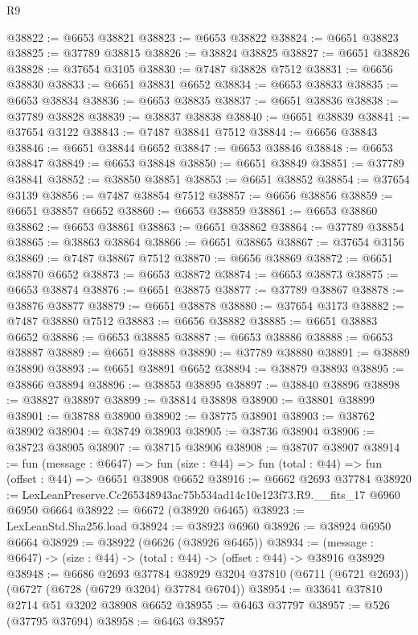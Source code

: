 \begin{lexlean}{R9}
\begin{coremodule}
@38822 := @6653 @38821
@38823 := @6653 @38822
@38824 := @6651 @38823
@38825 := @37789 @38815
@38826 := @38824 @38825
@38827 := @6651 @38826
@38828 := @37654 @3105
@38830 := @7487 @38828 @7512
@38831 := @6656 @38830
@38833 := @6651 @38831 @6652
@38834 := @6653 @38833
@38835 := @6653 @38834
@38836 := @6653 @38835
@38837 := @6651 @38836
@38838 := @37789 @38828
@38839 := @38837 @38838
@38840 := @6651 @38839
@38841 := @37654 @3122
@38843 := @7487 @38841 @7512
@38844 := @6656 @38843
@38846 := @6651 @38844 @6652
@38847 := @6653 @38846
@38848 := @6653 @38847
@38849 := @6653 @38848
@38850 := @6651 @38849
@38851 := @37789 @38841
@38852 := @38850 @38851
@38853 := @6651 @38852
@38854 := @37654 @3139
@38856 := @7487 @38854 @7512
@38857 := @6656 @38856
@38859 := @6651 @38857 @6652
@38860 := @6653 @38859
@38861 := @6653 @38860
@38862 := @6653 @38861
@38863 := @6651 @38862
@38864 := @37789 @38854
@38865 := @38863 @38864
@38866 := @6651 @38865
@38867 := @37654 @3156
@38869 := @7487 @38867 @7512
@38870 := @6656 @38869
@38872 := @6651 @38870 @6652
@38873 := @6653 @38872
@38874 := @6653 @38873
@38875 := @6653 @38874
@38876 := @6651 @38875
@38877 := @37789 @38867
@38878 := @38876 @38877
@38879 := @6651 @38878
@38880 := @37654 @3173
@38882 := @7487 @38880 @7512
@38883 := @6656 @38882
@38885 := @6651 @38883 @6652
@38886 := @6653 @38885
@38887 := @6653 @38886
@38888 := @6653 @38887
@38889 := @6651 @38888
@38890 := @37789 @38880
@38891 := @38889 @38890
@38893 := @6651 @38891 @6652
@38894 := @38879 @38893
@38895 := @38866 @38894
@38896 := @38853 @38895
@38897 := @38840 @38896
@38898 := @38827 @38897
@38899 := @38814 @38898
@38900 := @38801 @38899
@38901 := @38788 @38900
@38902 := @38775 @38901
@38903 := @38762 @38902
@38904 := @38749 @38903
@38905 := @38736 @38904
@38906 := @38723 @38905
@38907 := @38715 @38906
@38908 := @38707 @38907
@38914 := fun (message : @6647) =>
  fun (size : @44) => fun (total : @44) => fun (offset : @44) => @6651 @38908 @6652
@38916 := @6662 @2693 @37784
@38920 := LexLeanPreserve.Cc265348943ac75b534ad14c10e123f73.R9.__fits_17 @6960 @6950 @6664
@38922 := @6672 (@38920 @6465)
@38923 := LexLeanStd.Sha256.load
@38924 := @38923 @6960
@38926 := @38924 @6950 @6664
@38929 := @38922 (@6626 (@38926 @6465))
@38934 := (message : @6647) -> (size : @44) -> (total : @44) -> (offset : @44) -> @38916 @38929
@38948 := @6686
    @2693
    @37784
    @38929
    @3204
    @37810
    (@6711 (@6721 @2693))
    (@6727 (@6728 (@6729 @3204) @37784 @6704))
@38954 := @33641 @37810 @2714 @51 @3202 @38908 @6652
@38955 := @6463 @37797
@38957 := @526 (@37795 @37694)
@38958 := @6463 @38957

\end{coremodule}
\end{lexlean}
